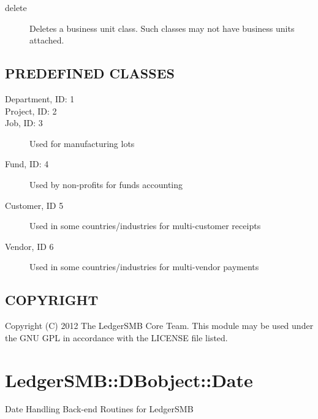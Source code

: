 \begin{description}
\begin{description}
\begin{description}
\begin{description}
\begin{description}
\begin{description}
\begin{description}
\begin{description}
\begin{description}
\begin{description}
\item[{delete}] \mbox{}

Deletes a business unit class.  Such classes may not have business units attached.

\end{description}
\subsection*{PREDEFINED CLASSES\label{LedgerSMB::DBObject::Business_Unit_Class_PREDEFINED_CLASSES}}
\begin{description}

\item[{Department, ID: 1}] \mbox{}
\item[{Project, ID: 2}] \mbox{}
\item[{Job, ID: 3}] \mbox{}

Used for manufacturing lots


\item[{Fund, ID: 4}] \mbox{}

Used by non-profits for funds accounting


\item[{Customer, ID 5}] \mbox{}

Used in some countries/industries for multi-customer receipts


\item[{Vendor, ID 6}] \mbox{}

Used in some countries/industries for multi-vendor payments

\end{description}
\subsection*{COPYRIGHT\label{LedgerSMB::DBObject::Business_Unit_Class_COPYRIGHT}}


Copyright (C) 2012 The LedgerSMB Core Team.  This module may be used under the
GNU GPL in accordance with the LICENSE file listed.

\section{LedgerSMB::DBobject::Date\label{LedgerSMB::DBobject::Date}}


Date Handling Back-end Routines for LedgerSMB


\end{description}
\end{description}
\end{description}
\end{description}
\end{description}
\end{description}
\end{description}
\end{description}
\end{description}
